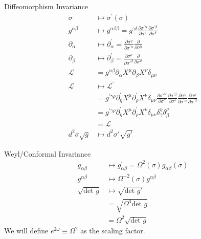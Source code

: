 \documentclass{beamer}
\begin{document}
\begin{frame}{Diffeomorphism Invariance}
    \begin{align}
    \sigma &\mapsto \sigma^{\prime}(\sigma) \\
        g^{\alpha \beta} &\mapsto g^{\alpha \beta \beta}=g^{\gamma \delta} \frac{\partial \sigma^{\prime \alpha}}{\partial \sigma^\gamma} \frac{\partial\sigma ^{\prime \beta}}{\partial \sigma^\delta}\\
        \partial_\alpha &\mapsto \partial_\alpha^{\prime}=\frac{\partial \sigma^\eta}{\partial \sigma^{\prime \alpha}} \frac{\partial}{\partial \sigma^\eta} \\
        \partial_\beta &\mapsto \partial_{\beta}^{\prime}=\frac{\partial \sigma^\rho}{\partial \sigma'^\beta} \frac{\partial}{\partial \sigma^\rho}\\
        \mathcal{L}&=g^{\alpha \beta} \partial_\alpha X^{\mu} \partial_\beta X^\nu \delta_{\mu \nu} \\
        \mathcal{L}&\mapsto \mathcal{L}^{\prime}\\
        &=g^{\prime \gamma \rho} \partial^{\prime}_\eta X^\mu \partial_\rho^{\prime} X^\nu \delta_{\mu \nu} \frac{\partial \sigma'^\alpha }{\partial \sigma^\gamma} 
\frac{\partial \sigma^{\prime \beta}}{\partial \sigma^\delta} 
\frac{\partial \sigma^{ \eta}}{\partial \sigma^{\prime \alpha}} \frac{\partial \sigma^{\rho}}{\partial \sigma^{\prime\beta}} \\
&=g^{\prime \gamma \rho} \partial^{\prime}_\eta X^\mu \partial_\rho^{\prime} X^\nu \delta_{\mu \nu} \delta^\eta_\gamma \delta^\rho_\beta \\
& =\mathcal{L} \\
d^2\sigma \sqrt{g} &\mapsto d^2\sigma' \sqrt{g'} 
    \end{align}
\end{frame}
\begin{frame}{Weyl/Conformal Invariance}
    \begin{align}
        g_{\alpha \beta} & \mapsto g_{\alpha \beta}^{\prime}=\Omega^2(\sigma) g_{\alpha \beta}(\sigma) \\
g^{\alpha \beta} & \mapsto \Omega^{-2}(\sigma) g^{\alpha \beta} \\
\sqrt{\text{det } g} & \mapsto\sqrt{\text{det } g'}\\&=\sqrt{\Omega^4 \text{det } g}\\&=\Omega^2 \sqrt{\text{det } g}
    \end{align}
    We will define $e^{2\omega} \equiv \Omega^2$ as the scaling factor.
\end{frame}
\end{document}
